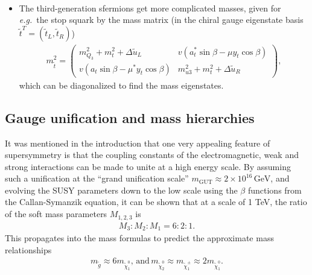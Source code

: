 \documentclass[twoside,english]{uiofysmaster}
\begin{document}
\begin{itemize}
\begin{align}
 	\end{align}
 	\item The third-generation sfermions get more complicated masses, given for {\it e.g.}\ the stop squark by the mass matrix (in the chiral gauge eigenstate basis $\tilde t^T = (\tilde t_L, \tilde t_R)$)
 	\begin{align}
 		m^2_{\tilde t} = \begin{pmatrix}
 			m^2_{Q_3} + m_t^2 + \Delta \tilde u_L & v(a_t^* \sin\beta - \mu y_t \cos\beta)\\
 			v(a_t \sin\beta - \mu^* y_t \cos\beta) & m^2_{u3} + m^2_t + \Delta \tilde u_R
 		\end{pmatrix},
 	\end{align}
 	which can be diagonalized to find the mass eigenstates.
 \end{itemize}

 \subsection{Gauge unification and mass hierarchies}
 It was mentioned in the introduction that one very appealing feature of supersymmetry is that the coupling constants of the electromagnetic, weak and strong interactions can be made to unite at a high energy scale. By assuming such a unification at the ``grand unification scale'' $m_\mathrm{GUT} \approx 2\times 10^{16} \,\mathrm{GeV}$, and evolving the SUSY parameters down to the low scale using the $\beta$ functions from the Callan-Symanzik equation, it can be shown that at a scale of 1 TeV, the ratio of the soft mass parameters $M_{1,2,3}$ is
 \begin{align}
 	M_3 : M_2 : M_1 = 6 : 2 : 1.
 \end{align}
 This propagates into the mass formulas to predict the approximate mass relationships
 \begin{align}
 	m_{\tilde g} \approx 6m_{\tilde \chi_1^0}, \, \mathrm{and} \, m_{\tilde \chi_2^0} \approx m_{\tilde \chi_1^\pm} \approx 2m_{\tilde \chi_1^0}.
 \end{align}
\end{document}
